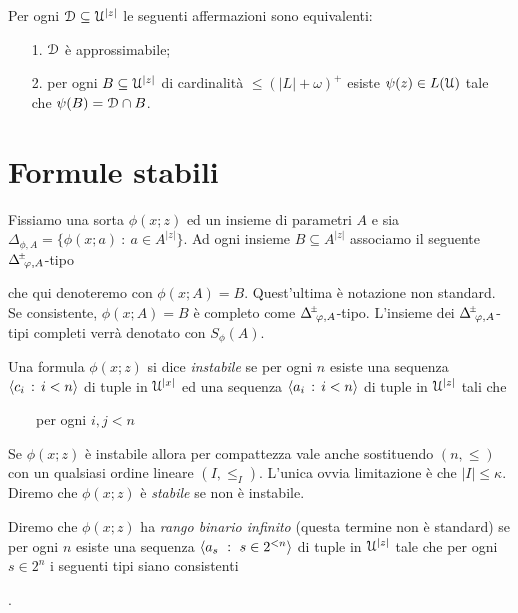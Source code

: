 \begin{proposition}\label{lem_approx_nonunif}
Per ogni $\EuScript D\subseteq\EuScript U^{|z|}$ le seguenti affermazioni sono equivalenti:
\begin{itemize}
\item[1.] $\EuScript D$ \`e approssimabile;
\item[2.] per ogni $B\subseteq\EuScript U^{|z|}$ di cardinalit\`a $\le(|L|+\omega)^+$ esiste $\psi(z)\in L(\EuScript U)$ tale che $\psi(B)=\EuScript D\cap B$.
\end{itemize}
\end{proposition}


\section{Formule stabili}
Fissiamo una sorta $\phi(x;z)$ ed un insieme di parametri $A$ e sia $\Delta_{\!\phi,A}=\{\phi(x;a)\ :\ a\in A^{|z|}\}$. Ad ogni insieme $B\subseteq A^{|z|}$ associamo il seguente $\pmDelta_{\!\phi,A}$-tipo 


che qui denoteremo con \emph{$\phi(x;A)=B$}. Quest'ultima \`e notazione non standard. Se consistente, $\phi(x;A)=B$ \`e completo come $\pmDelta_{\!\phi,A}$-tipo. L'insieme dei $\pmDelta_{\!\phi,A}$-tipi completi verr\`a denotato con \emph{$S_{\phi}(A)$}.

Una formula $\phi(x;z)$ si dice \emph{instabile\/} se per ogni $n$ esiste una sequenza $\langle c_i\,:\,i< n\rangle$ di tuple in $\EuScript U^{|x|}$ ed una sequenza $\langle a_i\,:\,i<n\rangle$ di tuple in $\EuScript U^{|z|}$ tali che 

 \ \ \ \ per ogni $i,j<n$

Se  $\phi(x;z)$ \`e instabile allora per compattezza  vale anche sostituendo $(n,\le)$ con un qualsiasi ordine lineare $(I,\le_I)$. L'unica ovvia limitazione \`e che $|I|\le\kappa$. Diremo che $\phi(x;z)$ \`e \emph{stabile\/} se non \`e instabile.   

Diremo che  $\phi(x;z)$ ha \emph{rango binario infinito\/} (questa termine non \`e standard) se per ogni $n$ esiste una sequenza  $\<a_s\ :\ s\in2^{<n}\>$ di tuple in $\EuScript U^{|z|}$ tale che  per ogni $s\in2^{n}$ i seguenti tipi siano consistenti

.

